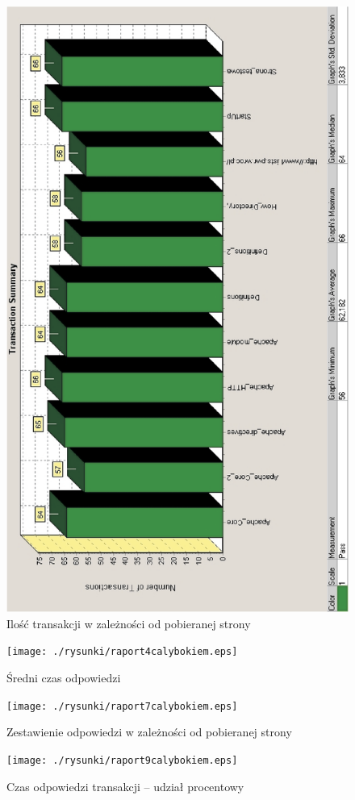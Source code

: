 \begin{figure}[h]
\centering
\includegraphics[width=4.5in]{./rysunki/rapor3calybokiem.eps}
\caption{Ilość transakcji w zależności od pobieranej strony}
\label{pobierana_strona}
\end{figure}
\begin{figure}[h]
\centering
\texttt{[image: ./rysunki/raport4calybokiem.eps]}
\caption{Średni czas odpowiedzi}
\label{srednia_odpowiedz}
\end{figure}
\begin{figure}[h]
\centering
\texttt{[image: ./rysunki/raport7calybokiem.eps]}
\caption{Zestawienie odpowiedzi w zależności od pobieranej strony}
\label{zestawienie_odpowiedzi}
\end{figure}
\begin{figure}[h]
\centering
\texttt{[image: ./rysunki/raport9calybokiem.eps]}
\caption{Czas odpowiedzi transakcji -- udział procentowy}
\label{procentowo}
\end{figure}
